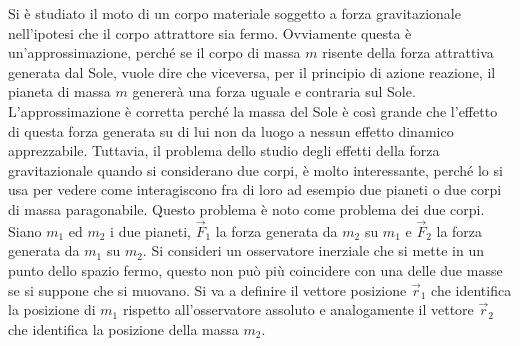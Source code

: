 \documentclass[10pt,a4paper]{book}
\begin{document}
Si è studiato il moto di un corpo materiale soggetto a forza gravitazionale nell'ipotesi che il corpo attrattore sia fermo. Ovviamente questa è un'approssimazione, perché se il corpo di massa $m$ risente della forza attrattiva generata dal Sole, vuole dire che viceversa, per il principio di azione reazione, il pianeta di massa $m$ genererà una forza uguale e contraria sul Sole. L'approssimazione è corretta perché la massa del Sole è così grande che l'effetto di questa forza generata su di lui non da luogo a nessun effetto dinamico apprezzabile. Tuttavia, il problema dello studio degli effetti della forza gravitazionale quando si considerano due corpi, è molto interessante, perché lo si usa per vedere come interagiscono fra di loro ad esempio due pianeti o due corpi di massa paragonabile. Questo problema è noto come problema dei due corpi. Siano $m_1$ ed $m_2$ i due pianeti, $\vec{F}_1$ la forza generata da $m_2$ su $m_1$ e $\vec{F}_2$ la forza generata da $m_1$ su $m_2$. Si consideri un osservatore inerziale che si mette in un punto dello spazio fermo, questo non può più coincidere con una delle due masse se si suppone che si muovano. Si va a definire il vettore posizione $\vec{r}_1$ che identifica la posizione di $m_1$ rispetto all'osservatore assoluto e analogamente il vettore $\vec{r}_2$ che identifica la posizione della massa $m_2$.
\end{document}
